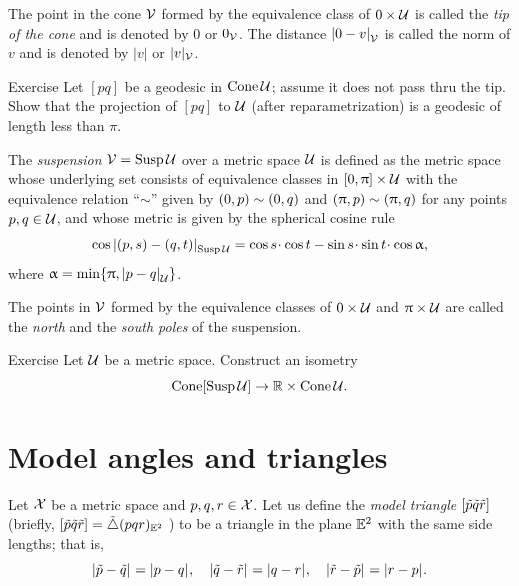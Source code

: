 The point in the cone $\mathcal{V}$ formed by the equivalence class of $0\times\spc{U}$ is called the \emph{tip of the cone} and is denoted by $0$ or $0_{\mathcal{V}}$.
The distance $\dist{0}{v}{\spc{V}}$ is called the norm of $v$ and is denoted by $|v|$ or $|v|_{\mathcal{V}}$.

\begin{thm}[!]{Exercise}\label{ex:cone-geod}
Let $[pq]$ be a geodesic in $\mathop{\rm Cone}\nolimits\mathcal{U}$;
assume it does not pass thru the tip.
Show that the projection of $[pq]$ to $\mathcal{U}$ (after reparametrization) is a geodesic of length less than $\pi$.
\end{thm}


The \emph{suspension} $\mathcal{V}=\mathop{\rm Susp}\nolimits\mathcal{U}$ over a metric space $\mathcal{U}$
is defined as the metric space whose underlying set consists of equivalence classes in
$[0,\pi]\times \spc{U}$ with the equivalence relation ``$\sim$'' given by $(0,p)\z\sim (0,q)$ and $(\pi,p)\z\sim (\pi,q)$ for any points $p,q\in\spc{U}$,
and whose metric is given by the  spherical cosine rule
\[
\cos\dist{(p,s)}{(q,t)}{\Susp\spc{U}} 
=
\cos s\cdot\cos t-\sin s\cdot\sin t\cdot\cos\alpha,
\]
where $\alpha= \min\{\pi, \dist{p}{q}{\spc{U}}\}$.

The points in $\mathcal{V}$ formed by the equivalence classes of $0\times\spc{U}$ and $\pi\times\spc{U}$ are called  the \emph{north} and the  \emph{south poles} of the suspension.

\begin{thm}{Exercise}\label{ex:product-cone}
Let $\mathcal{U}$ be a metric space.
Construct an isometry
\[\Cone[\Susp\spc{U}]\to\RR\times \Cone\spc{U}.\]

\end{thm}

\section{Model angles and triangles}\label{sec:mod-tri/angles}

Let $\mathcal{X}$ be a metric space and 
$p,q,r\in \spc{X}$. 
Let us define the \emph{model triangle} $[\tilde p\tilde q\tilde r]$ 
(briefly, 
$[\tilde p\tilde q\tilde r]=\tilde\triangle(p q r)_{\mathbb{E}^2}$%
) to be a triangle in the plane $\mathbb{E}^2$ with the same side lengths; that is,
\[\dist{\tilde p}{\tilde q}{}=\dist{p}{q}{},
\quad\dist{\tilde q}{\tilde r}{}=\dist{q}{r}{},
\quad\dist{\tilde r}{\tilde p}{}=\dist{r}{p}{}.\]

